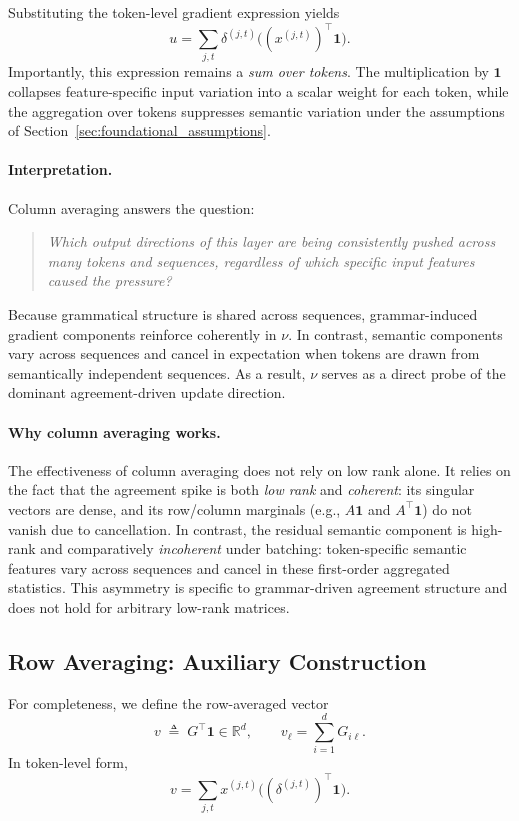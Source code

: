 Substituting the token-level gradient expression yields
\[
u
=
\sum_{j,t}
\delta^{(j,t)} \bigl( (x^{(j,t)})^\top \mathbf{1} \bigr).
\]
Importantly, this expression remains a \emph{sum over tokens}.
The multiplication by $\mathbf{1}$ collapses feature-specific input variation into
a scalar weight for each token, while the aggregation over tokens suppresses
semantic variation under the assumptions of
Section~\ref{sec:foundational_assumptions}.

\paragraph{Interpretation.}
Column averaging answers the question:
\begin{quote}
\emph{Which output directions of this layer are being consistently pushed across
many tokens and sequences, regardless of which specific input features caused the
pressure?}
\end{quote}

Because grammatical structure is shared across sequences, grammar-induced gradient
components reinforce coherently in $\nu$.
In contrast, semantic components vary across sequences and cancel in expectation
when tokens are drawn from semantically independent sequences.
As a result, $\nu$ serves as a direct probe of the dominant agreement-driven update
direction.

\paragraph{Why column averaging works.}
The effectiveness of column averaging does not rely on low rank alone.
It relies on the fact that the agreement spike is both \emph{low rank} and \emph{coherent}:
its singular vectors are dense, and its row/column marginals (e.g., $A\mathbf{1}$ and
$A^\top\mathbf{1}$) do not vanish due to cancellation.
In contrast, the residual semantic component is high-rank and comparatively \emph{incoherent}
under batching: token-specific semantic features vary across sequences and cancel in
these first-order aggregated statistics.
This asymmetry is specific to grammar-driven agreement structure and does not hold
for arbitrary low-rank matrices.

\subsection{Row Averaging: Auxiliary Construction}
\label{sec:row_averaging}

For completeness, we define the row-averaged vector
\[
v \;\triangleq\; G^\top \mathbf{1} \in \mathbb{R}^{d},
\qquad
v_\ell = \sum_{i=1}^{d} G_{i\ell}.
\]
In token-level form,
\[
v
=
\sum_{j,t}
x^{(j,t)} \bigl( (\delta^{(j,t)})^\top \mathbf{1} \bigr).
\]


